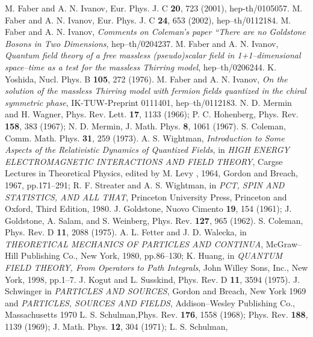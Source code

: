 \documentclass[a4paper,12pt] {article}
\begin{document}
\begin{thebibliography}{9}
M. Faber and A. N. Ivanov, Eur. Phys. J. C {\bf
20}, 723 (2001), hep-th/0105057.
%
M. Faber and A. N. Ivanov, 
Eur. Phys. J. C {\bf 24}, 653 (2002), hep--th/0112184.
%
M. Faber and A. N. Ivanov,
{\it Comments on Coleman's paper ``There are no Goldstone Bosons 
in Two Dimensions}, hep--th/0204237.
%
M. Faber and A. N. Ivanov,
{\it Quantum field theory of a free massless (pseudo)scalar field in
1+1--dimensional space--time as a test for the massless Thirring model},
hep--th/0206244.
%
K. Yoshida,
Nucl. Phys. B {\bf 105}, 272 (1976).
%
M. Faber and A. N. Ivanov,
{\it On the solution of the massless
Thirring model  with fermion
fields quantized in the chiral symmetric phase},
IK-TUW-Preprint 0111401, hep--th/0112183.
%
N. D. Mermin and H. Wagner, 
Phys. Rev. Lett. {\bf 17},
1133 (1966); 
P. C. Hohenberg, 
Phys. Rev. {\bf 158}, 383 (1967);
N. D. Mermin, J. Math. Phys. {\bf 8}, 1061 (1967).
%
S. Coleman, 
Comm. Math. Phys. {\bf 31}, 259 (1973).
%
A. S. Wightman, 
{\it Introduction to Some Aspects of
the Relativistic Dynamics of Quantized Fields}, in 
{\it HIGH ENERGY ELECTROMAGNETIC INTERACTIONS AND FIELD THEORY}, 
Carg\coordHE{}se
Lectures in Theoretical Physics, edited by M. Levy , 1964, Gordon and
Breach, 1967, pp.171--291;
R. F. Streater and A. S. Wightman,
in {\it PCT, SPIN AND STATISTICS, AND ALL THAT},
Princeton University Press, Princeton and Oxford, Third Edition, 1980.
%
J. Goldstone,
Nuovo Cimento {\bf 19}, 154 (1961);
J. Goldstone, A. Salam, and S. Weinberg,
Phys. Rev. {\bf 127}, 965 (1962).
%
S. Coleman,
Phys. Rev. D {\bf 11}, 2088 (1975).
%
A. L. Fetter and J. D. Walecka,
in {\it THEORETICAL MECHANICS OF PARTICLES AND CONTINUA},
McGraw--Hill Publishing Co., New York, 1980, pp.86--130;
K. Huang,
in {\it QUANTUM FIELD THEORY, From Operators to Path Integrals},
John Willey \myHighlight{$\&$}\coordHE{} Sons, Inc., New York, 1998, pp.1--7.
%
J. Kogut and L. Susskind,
Phys. Rev. D {\bf 11}, 3594 (1975).
%
J. Schwinger 
in {\it PARTICLES AND SOURCES}, Gordon and
Breach, New York 1969 and 
{\it PARTICLES, SOURCES AND FIELDS},
Addison--Wesley Publishing Co., Massachusetts 1970
%
L. S. Schulman,Phys. Rev. {\bf 176}, 1558 (1968); 
Phys. Rev. {\bf 188}, 1139 (1969);
J. Math. Phys. {\bf 12}, 304 (1971);
L. S. Schulman,

\end{thebibliography}
\end{document}
